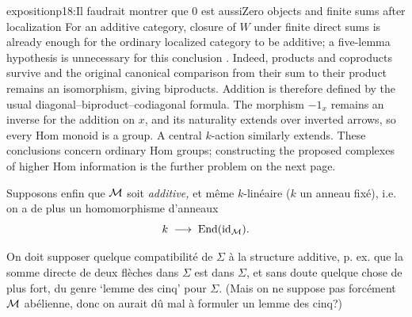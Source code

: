 \begin{dcomment}{exposition}{p18:Il faudrait montrer que 0 est aussi}{Zero objects and finite sums after localization}
For an additive category, closure of $W$ under finite direct sums is already enough for the ordinary localized category to be additive; a five-lemma hypothesis is unnecessary for this conclusion \citep[Lemma 2.2.1]{Krause2021}. Indeed, products and coproducts survive and the original canonical comparison from their sum to their product remains an isomorphism, giving biproducts. Addition is therefore defined by the usual diagonal--biproduct--codiagonal formula. The morphism $-1_x$ remains an inverse for the addition on $x$, and its naturality extends over inverted arrows, so every Hom monoid is a group. A central $k$-action similarly extends. These conclusions concern ordinary Hom groups; constructing the proposed complexes of higher Hom information is the further problem on the next page.
\end{dcomment}


Supposons enfin que $\mathcal{M}$ soit \textit{additive,} et même $k$-linéaire ($k$ un anneau fixé), i.e. on a de plus un homomorphisme d'anneaux
\[
k \;\longrightarrow\; \mathrm{End}(\mathrm{id}_{\mathcal{M}}).
\]

On doit supposer quelque compatibilité de $\Sigma$ à la structure additive, p. ex. que la somme directe de deux flèches dans $\Sigma$ est dans $\Sigma$, et sans doute quelque chose de plus fort, du genre `lemme des cinq' pour $\Sigma$. (Mais on ne suppose pas forcément $\mathcal{M}$ abélienne, donc on aurait dû mal à formuler un lemme des cinq?) %


